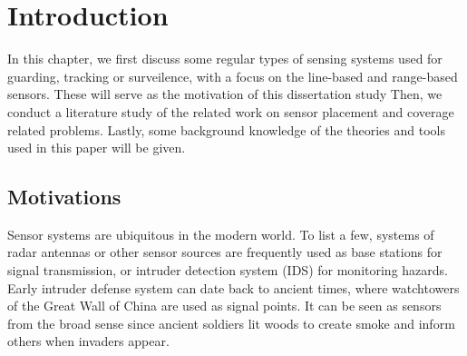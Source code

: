 
\chapter{Introduction} 
\thispagestyle{myheadings} 
In this chapter, we first discuss some regular types of sensing systems 
used for guarding, tracking or surveilence, 
with a focus on the line-based and range-based sensors. 
These will serve as the motivation of this dissertation study
Then, we conduct a literature study of the related work on sensor placement and 
coverage related problems. 
Lastly, some background knowledge of the theories and tools used in this paper will be given. 

\section{Motivations} 
Sensor systems are ubiquitous in the modern world. 
To list a few, systems of radar antennas 
or other sensor sources are frequently used as base stations for signal transmission, 
or intruder detection system (IDS) for monitoring hazards. 
Early intruder defense system can date back to ancient times, where 
watchtowers of the Great Wall of China are used as signal points. 
It can be seen as sensors from the broad sense 
since ancient soldiers lit woods to create smoke and inform others when invaders appear. 
